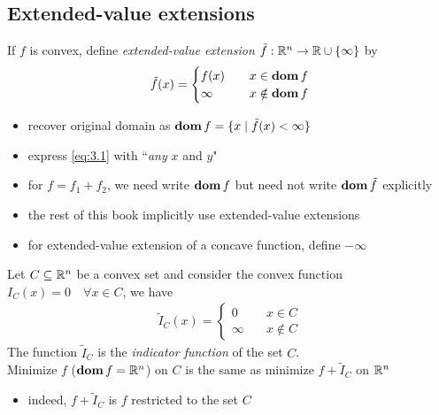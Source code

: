 \subsection{Extended-value extensions}
If $f$ is convex, define \textit{extended-value extension} $\tilde{f}:\mathbb{R}^n\rightarrow\mathbb{R}\cup\{\infty\}$ by
\begin{align*}
  \tilde{f}(x)=
    \begin{cases}
      f(x)\quad&x\in\mathop{\bf dom} f\\
      \infty\quad&x\notin\mathop{\bf dom} f
    \end{cases}
\end{align*}
\begin{itemize}
  \item recover original domain as $\mathop{\bf dom} f=\{x\mid \tilde{f}(x)<\infty\}$
  \item express \eqref{eq:3.1} with ``\textit{any} $x$ and $y$"
  \item for $f=f_1+f_2$, we need write $\mathop{\bf dom} f$ but need not write $\mathop{\bf dom} \tilde{f}$ explicitly
  \item the rest of this book implicitly use extended-value extensions
  \item for extended-value extension of a concave function, define $-\infty$
\end{itemize}
\begin{example}
  Let $C\subseteq\mathbb{R}^n$ be a convex set and consider the convex function $I_C(x)=0\quad\forall x\in C$, we have
  \begin{align*}
    \tilde{I}_C(x)=
      \begin{cases}
        0\quad&x\in C\\
        \infty\quad&x\notin C
      \end{cases}
  \end{align*}
  The function $\tilde{I}_C$ is the \textit{indicator function} of the set $C$.\\
  Minimize $f$ ($\mathop{\bf dom} f=\mathbb{R}^n$) on $C$ is the same as minimize $f+\tilde{I}_C$ on $\mathbb{R}^n$
  \begin{itemize}
    \item indeed, $f+\tilde{I}_C$ is $f$ restricted to the set $C$
  \end{itemize}
\end{example}

